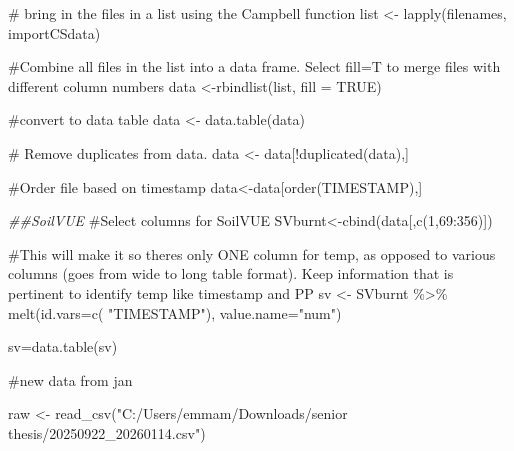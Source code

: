 \documentclass[
  letterpaper,
  DIV=11,
  numbers=noendperiod]{scrartcl}
\newenvironment{Shaded}{\begin{snugshade}}{\end{snugshade}}
\newcommand{\AttributeTok}[1]{\textcolor[rgb]{0.40,0.45,0.13}{#1}}
\newcommand{\CommentTok}[1]{\textcolor[rgb]{0.37,0.37,0.37}{#1}}
\newcommand{\ConstantTok}[1]{\textcolor[rgb]{0.56,0.35,0.01}{#1}}
\newcommand{\DecValTok}[1]{\textcolor[rgb]{0.68,0.00,0.00}{#1}}
\newcommand{\DocumentationTok}[1]{\textcolor[rgb]{0.37,0.37,0.37}{\textit{#1}}}
\newcommand{\FunctionTok}[1]{\textcolor[rgb]{0.28,0.35,0.67}{#1}}
\newcommand{\NormalTok}[1]{\textcolor[rgb]{0.00,0.23,0.31}{#1}}
\newcommand{\OtherTok}[1]{\textcolor[rgb]{0.00,0.23,0.31}{#1}}
\newcommand{\SpecialCharTok}[1]{\textcolor[rgb]{0.37,0.37,0.37}{#1}}
\newcommand{\StringTok}[1]{\textcolor[rgb]{0.13,0.47,0.30}{#1}}
\begin{document}
\begin{Shaded}
\begin{Highlighting}[]
\CommentTok{\# bring in the files in a list using the Campbell function}
\NormalTok{list }\OtherTok{\textless{}{-}} \FunctionTok{lapply}\NormalTok{(filenames, importCSdata)}

\CommentTok{\#Combine all files in the list into a data frame. Select fill=T to merge files with different column numbers}
\NormalTok{data }\OtherTok{\textless{}{-}}\FunctionTok{rbindlist}\NormalTok{(list, }\AttributeTok{fill =} \ConstantTok{TRUE}\NormalTok{)}

\CommentTok{\#convert to data table}
\NormalTok{data }\OtherTok{\textless{}{-}} \FunctionTok{data.table}\NormalTok{(data)}

\CommentTok{\# Remove duplicates from data.}
\NormalTok{data }\OtherTok{\textless{}{-}}\NormalTok{ data[}\SpecialCharTok{!}\FunctionTok{duplicated}\NormalTok{(data),]}

\CommentTok{\#Order file based on timestamp}
\NormalTok{data}\OtherTok{\textless{}{-}}\NormalTok{data[}\FunctionTok{order}\NormalTok{(TIMESTAMP),]}


\DocumentationTok{\#\#SoilVUE}
\CommentTok{\#Select columns for SoilVUE}
\NormalTok{SVburnt}\OtherTok{\textless{}{-}}\FunctionTok{cbind}\NormalTok{(data[,}\FunctionTok{c}\NormalTok{(}\DecValTok{1}\NormalTok{,}\DecValTok{69}\SpecialCharTok{:}\DecValTok{356}\NormalTok{)])}

\CommentTok{\#This will make it so there\textquotesingle{}s only ONE column for temp, as opposed to various columns (goes from wide to long table format). Keep information that is pertinent to identify temp like timestamp and PP}
\NormalTok{sv }\OtherTok{\textless{}{-}}\NormalTok{ SVburnt }\SpecialCharTok{\%\textgreater{}\%}
  \FunctionTok{melt}\NormalTok{(}\AttributeTok{id.vars=}\FunctionTok{c}\NormalTok{( }\StringTok{"TIMESTAMP"}\NormalTok{), }\AttributeTok{value.name=}\StringTok{"num"}\NormalTok{)}

\NormalTok{sv}\OtherTok{=}\FunctionTok{data.table}\NormalTok{(sv)}
\end{Highlighting}
\end{Shaded}

\begin{Shaded}
\begin{Highlighting}[]
\CommentTok{\#new data from jan}

\NormalTok{raw }\OtherTok{\textless{}{-}} \FunctionTok{read\_csv}\NormalTok{(}\StringTok{"C:/Users/emmam/Downloads/senior thesis/20250922\_20260114.csv"}\NormalTok{)}
\end{Highlighting}
\end{Shaded}
\end{document}

